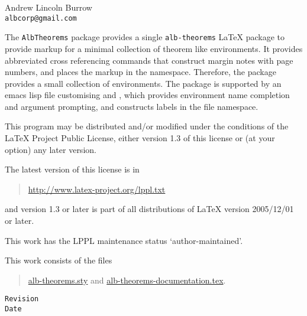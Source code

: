 \documentclass[11pt,a4paper,oneside,titlepage]{alb-corp}
\begin{document}


\begin{albTitlePage}


  Andrew Lincoln Burrow\\
  \texttt{albcorp@gmail.com}



  The \texttt{AlbTheorems} package provides a single
  \texttt{alb-theorems} \LaTeX{} package to provide markup for a minimal
  collection of theorem like environments.  It provides abbreviated
  cross referencing commands that construct margin notes with page
  numbers, and places the markup in the \albLogo{} namespace.
  Therefore, the package provides a small collection of environments.
  The package is supported by an emacs lisp file customising \AUCTeX{}
  and \RefTeX{}, which provides environment name completion and argument
  prompting, and constructs labels in the file namespace.



  This program may be distributed and/or modified under the conditions
  of the \LaTeX{} Project Public License, either version 1.3 of this
  license or (at your option) any later version.

  \medskip{}

  The latest version of this license is in
  \begin{quote}
    \url{http://www.latex-project.org/lppl.txt}
  \end{quote}
  and version 1.3 or later is part of all distributions of LaTeX version
  2005/12/01 or later.

  \medskip{}

  This work has the LPPL maintenance status `author-maintained'.

  \medskip{}

  This work consists of the files
  \begin{quote}
    \begin{flushleft}
      \url{alb-theorems.sty} and \url{alb-theorems-documentation.tex}.
    \end{flushleft}
  \end{quote}



  \verb$Revision$\\
  \verb$Date$

\end{albTitlePage}
\end{document}
